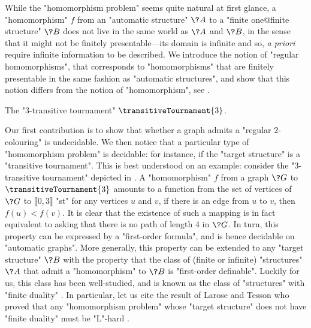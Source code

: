 While the "homomorphism problem" seems quite natural at first glance, a "homomorphism" $f$
from an "automatic structure" $\?A$ to a "finite one@finite structure" $\?B$ does not live
in the same world as $\?A$ and $\?B$, in the sense that it might not be finitely presentable---its domain is infinite and so, \emph{a priori} require infinite information to be described.
We introduce the notion of "regular homomorphisms", that corresponds to "homomorphisms" that
are finitely presentable in the same fashion as "automatic structures", and show that
this notion differs from the notion of "homomorphism",
see .

\begin{marginfigure}
	\centering
	\begin{tikzpicture}
		
	\end{tikzpicture}
	\caption{
		\AP\label{fig:3-transitive-tournament}
		The "$3$-transitive tournament" $\transitiveTournament{3}$.
	}
\end{marginfigure}
Our first contribution is to show that whether a graph admits a "regular $2$-colouring" is undecidable. We then notice that a particular type of
"homomorphism problem" is decidable: for instance, if the "target structure"
is a "transitive tournament". This is best understood on an example: consider the "$3$-transitive 
tournament" depicted in .
A "homomorphism" $f$ from a graph $\?G$ to $\transitiveTournament{3}$ amounts to a function
from the set of vertices of $\?G$ to $\lBrack 0,3\rBrack$ "st"
for any vertices $u$ and $v$, if there is an edge from $u$ to $v$, then
$f(u) < f(v)$. It is clear that the existence of such a mapping is in fact equivalent 
to asking that there is no path of length $4$ in $\?G$.
In turn, this property can be expressed by a "first-order formula", and is hence decidable
on "automatic graphs".
More generally, this property can be extended to any "target structure" $\?B$ with the property
that the class of (finite or infinite) "structures" $\?A$ that admit a "homomorphism" to $\?B$
is "first-order definable".
Luckily for us, this class has been well-studied, and is known as the class of "structures"
with "finite duality" \cite{Atserias2008DigraphColoring}. In particular, let us cite the result of Larose and Tesson
who proved that any "homomorphism problem" whose "target structure" does not have "finite duality"
must be "L"-hard \cite{LaroseTesson2009UniversalAlgebraCSP}.

